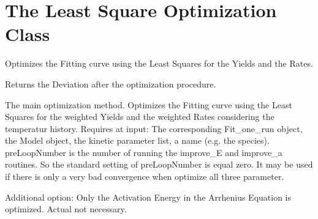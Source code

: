 \documentclass[letterpaper,10pt,english]{sphinxmanual}
\begin{document}
\section{The Least Square Optimization Class}
\label{FittingClasses:the-least-square-optimization-class}

\begin{fulllineitems}
\label{FittingClasses:Fitter.LeastSquarsEstimator}
Optimizes the Fitting curve using the Least Squares for the Yields and the Rates.

\begin{fulllineitems}
\label{FittingClasses:Fitter.LeastSquarsEstimator.Deviation}
Returns the Deviation after the optimization procedure.

\end{fulllineitems}


\begin{fulllineitems}
\label{FittingClasses:Fitter.LeastSquarsEstimator.estimate_T}
The main optimization method. Optimizes the Fitting curve using the Least Squares for the weighted Yields and the weighted Rates considering the temperatur history. Requires at input: The corresponding Fit\_one\_run object, the Model object, the kinetic parameter list, a name (e.g. the species). preLoopNumber is the number of running the  improve\_E and improve\_a routines. So the standard setting of preLoopNumber is equal zero. It may be used if there is only a very bad convergence when optimize all three parameter.

\end{fulllineitems}


\begin{fulllineitems}
\label{FittingClasses:Fitter.LeastSquarsEstimator.improve_E}
Additional option: Only the Activation Energy in the Arrhenius Equation is optimized. Actual not necessary.


\end{fulllineitems}
\end{fulllineitems}
\end{document}
